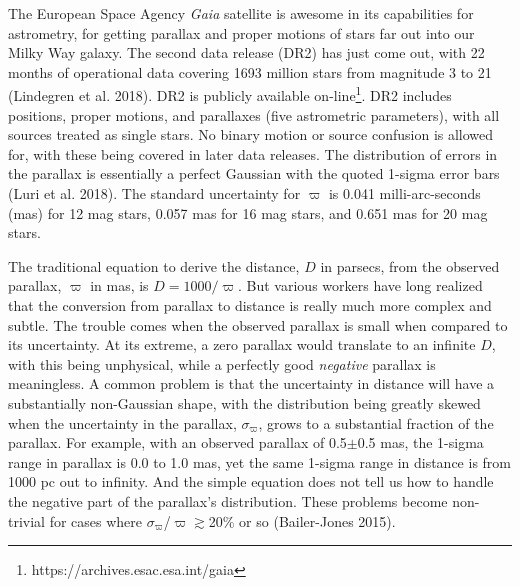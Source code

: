 \documentclass[a4paper,fleqn,usenatbib]{mnras}
\begin{document}
The European Space Agency {\it Gaia} satellite is awesome in its capabilities for astrometry, for getting parallax and proper motions of stars far out into our Milky Way galaxy.  The second data release (DR2) has just come out, with 22 months of operational data covering 1693 million stars from magnitude 3 to 21 (Lindegren et al. 2018).  DR2 is publicly available on-line{\footnote{https://archives.esac.esa.int/gaia}}.  DR2 includes positions, proper motions, and parallaxes (five astrometric parameters), with all sources treated as single stars.  No binary motion or source confusion is allowed for, with these being covered in later data releases.  The distribution of errors in the parallax is essentially a perfect Gaussian with the quoted 1-sigma error bars (Luri et al. 2018).  The standard uncertainty for $\varpi$ is 0.041 milli-arc-seconds (mas) for 12 mag stars, 0.057 mas for 16 mag stars, and 0.651 mas for 20 mag stars.

The traditional equation to derive the distance, $D$ in parsecs, from the observed parallax, $\varpi$ in mas, is $D=1000/\varpi$.  But various workers have long realized that the conversion from parallax to distance is really much more complex and subtle.  The trouble comes when the observed parallax is small when compared to its uncertainty.  At its extreme, a zero parallax would translate to an infinite $D$, with this being unphysical, while a perfectly good {\it negative} parallax is meaningless.  A common problem is that the uncertainty in distance will have a substantially non-Gaussian shape, with the distribution being greatly skewed when the uncertainty in the parallax, $\sigma_{\varpi}$, grows to a substantial fraction of the parallax.  For example, with an observed parallax of 0.5$\pm$0.5 mas, the 1-sigma range in parallax is 0.0 to 1.0 mas, yet the same 1-sigma range in distance is from 1000 pc out to infinity.  And the simple equation does not tell us how to handle the negative part of the parallax's distribution.  These problems become non-trivial for cases where $\sigma_{\varpi}$/$\varpi$$\gtrsim$20\% or so (Bailer-Jones 2015).
\end{document}
